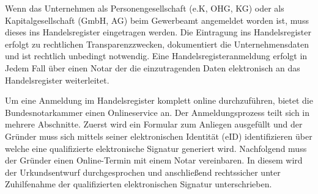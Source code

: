 Wenn das Unternehmen als Personengesellschaft (e.K, OHG, KG) oder als Kapitalgesellschaft (GmbH, AG) beim Gewerbeamt angemeldet worden ist, muss dieses ins Handelsregister eingetragen werden. 
Die Eintragung ins Handelsregister erfolgt zu rechtlichen Transparenzzwecken, dokumentiert die Unternehmensdaten und ist rechtlich unbedingt notwendig. 
Eine Handelsregisteranmeldung erfolgt in Jedem Fall über einen Notar der die einzutragenden Daten elektronisch an das Handelsregister weiterleitet. 

Um eine Anmeldung im Handelsregister komplett online durchzuführen, bietet die Bundesnotarkammer einen Onlineservice an. 
Der Anmeldungsprozess teilt sich in mehrere Abschnitte. Zuerst wird ein Formular zum Anliegen ausgefüllt und der Gründer muss sich mittels seiner elektronischen Identität (eID) identifizieren über welche eine qualifizierte elektronische Signatur generiert wird. 
Nachfolgend muss der Gründer einen Online-Termin mit einem Notar vereinbaren. In diesem wird der Urkundsentwurf durchgesprochen und anschließend rechtssicher unter Zuhilfenahme der qualifizierten elektronischen Signatur unterschrieben. 
